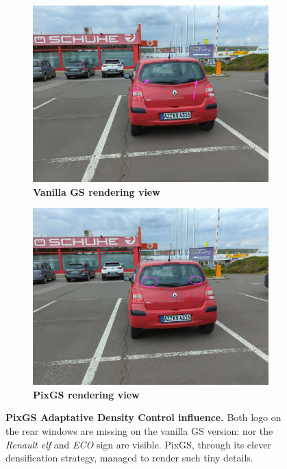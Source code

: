 \begin{figure}[htb!]
  \centering
  \begin{subfigure}[b]{0.45\linewidth}
    \includegraphics[width=\linewidth]{images/gaussiansplatting/00029-gs.png}
    \caption{\textbf{Vanilla GS rendering view}}
    \label{fig:view3}
  \end{subfigure}
  \quad %
  \begin{subfigure}[b]{0.45\linewidth}
    \includegraphics[width=\linewidth]{images/gaussiansplatting/00029-pixgs.png}
    \caption{\textbf{PixGS rendering view}}
    \label{fig:gs-view3-gs}
  \end{subfigure}
  \caption{\textbf{PixGS Adaptative Density Control influence.} Both logo on the rear windows are missing on the vanilla GS version: nor the \textit{Renault elf} and \textit{ECO} sign are visible. PixGS, through its clever densification strategy, managed to render such tiny details.}
  \label{fig:gs-pigs}
\end{figure}

